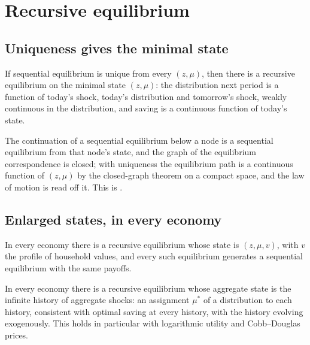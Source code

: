 \section{Recursive equilibrium}\label{sec:recursive}

\subsection{Uniqueness gives the minimal state}

\begin{theorem}\label{thm:minimal}
If sequential equilibrium is unique from every $(z,\mu)$, then there is a recursive equilibrium on
the minimal state $(z,\mu)$: the distribution next period is a function of today's shock, today's
distribution and tomorrow's shock, weakly continuous in the distribution, and saving is a continuous
function of today's state.
\end{theorem}

\noindent
The continuation of a sequential equilibrium below a node is a sequential equilibrium from that
node's state, and the graph of the equilibrium correspondence is closed; with uniqueness the
equilibrium path is a continuous function of $(z,\mu)$ by the closed-graph theorem on a compact
space, and the law of motion is read off it. This is \citet[Proposition 2]{cao2020}.

\subsection{Enlarged states, in every economy}

\begin{theorem}\label{thm:valuestate}
In every economy there is a recursive equilibrium whose state is $(z,\mu,v)$, with $v$ the profile
of household values, and every such equilibrium generates a sequential equilibrium with the same
payoffs.
\end{theorem}

\begin{theorem}\label{thm:history}
In every economy there is a recursive equilibrium whose aggregate state is the infinite history of
aggregate shocks: an assignment $\mu^*$ of a distribution to each history, consistent with optimal
saving at every history, with the history evolving exogenously. This holds in particular with
logarithmic utility and Cobb--Douglas prices.
\end{theorem}

